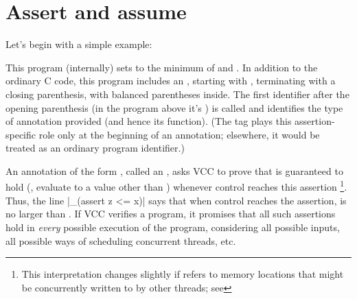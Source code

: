 \section{Assert and assume}
\label{sect:assert-assume}


Let's begin with a simple example:

This program (internally) sets  to the minimum of  and
. In addition to the ordinary C code, this program includes an
, starting with \vcc{_(}, terminating with a closing
parenthesis, with balanced parentheses inside. The first identifier
after the opening parenthesis (in the program above it's )
is called  and
identifies the type of annotation provided (and hence its function).
(The tag plays this assertion-specific role only 
at the beginning of an annotation; elsewhere, it would be treated as
an ordinary program identifier.)

An annotation of the form , called an , asks VCC to prove that
 is guaranteed to hold (\ie, evaluate to a value other than )
whenever control reaches this assertion%
\footnote{
  This interpretation changes slightly if  refers to
  memory locations that might be concurrently written to by other
  threads; see }.  
Thus, the line \vcc|_(assert z <= x)| says
that when control reaches the assertion,  is no larger than .
If VCC verifies a program, it promises that all such assertions
hold in \emph{every} possible execution of the program, considering all possible inputs,
all possible ways of scheduling concurrent threads, etc. 

